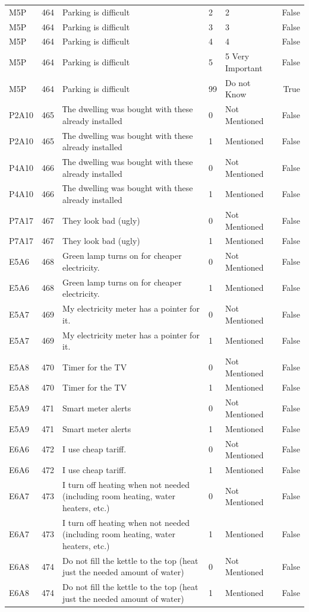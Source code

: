 \begin{tabular}{lrlllr}
M5P & 464 & Parking is difficult & 2 & 2 & False \\
M5P & 464 & Parking is difficult & 3 & 3 & False \\
M5P & 464 & Parking is difficult & 4 & 4 & False \\
M5P & 464 & Parking is difficult & 5 & 5 Very Important & False \\
M5P & 464 & Parking is difficult & 99 & Do not Know & True \\
P2A10 & 465 & Тhe dwelling was bought with these already installed & 0 & Not Mentioned & False \\
P2A10 & 465 & Тhe dwelling was bought with these already installed & 1 & Mentioned & False \\
P4A10 & 466 & Тhe dwelling was bought with these already installed & 0 & Not Mentioned & False \\
P4A10 & 466 & Тhe dwelling was bought with these already installed & 1 & Mentioned & False \\
P7A17 & 467 & They look bad (ugly) & 0 & Not Mentioned & False \\
P7A17 & 467 & They look bad (ugly) & 1 & Mentioned & False \\
E5A6 & 468 & Green lamp turns on for cheaper electricity. & 0 & Not Mentioned & False \\
E5A6 & 468 & Green lamp turns on for cheaper electricity. & 1 & Mentioned & False \\
E5A7 & 469 & My electricity meter has a pointer for it. & 0 & Not Mentioned & False \\
E5A7 & 469 & My electricity meter has a pointer for it. & 1 & Mentioned & False \\
E5A8 & 470 & Timer for the TV & 0 & Not Mentioned & False \\
E5A8 & 470 & Timer for the TV & 1 & Mentioned & False \\
E5A9 & 471 & Smart meter alerts & 0 & Not Mentioned & False \\
E5A9 & 471 & Smart meter alerts & 1 & Mentioned & False \\
E6A6 & 472 & I use cheap tariff. & 0 & Not Mentioned & False \\
E6A6 & 472 & I use cheap tariff. & 1 & Mentioned & False \\
E6A7 & 473 & I turn off heating when not needed (including room heating, water heaters, etc.) & 0 & Not Mentioned & False \\
E6A7 & 473 & I turn off heating when not needed (including room heating, water heaters, etc.) & 1 & Mentioned & False \\
E6A8 & 474 & Do not fill the kettle to the top (heat just the needed amount of water) & 0 & Not Mentioned & False \\
E6A8 & 474 & Do not fill the kettle to the top (heat just the needed amount of water) & 1 & Mentioned & False \\
\bottomrule
\end{tabular}
